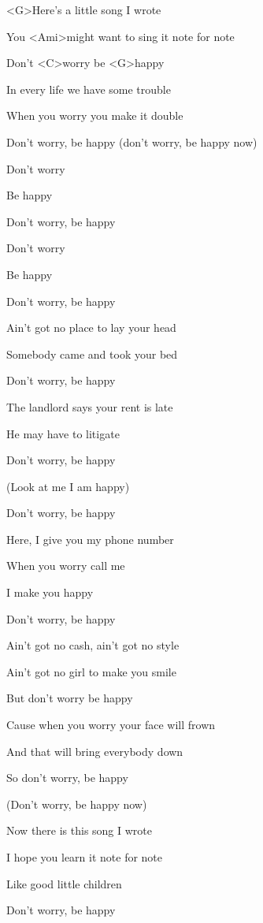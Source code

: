 

\zs
<G>Here's a little song I wrote 

You <Ami>might want to sing it note for note 

Don't <C>worry be <G>happy

In every life we have some trouble

When you worry you make it double 

Don't worry, be happy (don't worry, be happy now)
\ks

\zr
Don't worry 

Be happy

Don't worry, be happy

Don't worry

Be happy

Don't worry, be happy
\kr

\zs
Ain't got no place to lay your head 

Somebody came and took your bed

Don't worry, be happy 

The landlord says your rent is late 

He may have to litigate 

Don't worry, be happy 

(Look at me I am happy)
\ks

\zr
Don't worry, be happy 

Here, I give you my phone number 

When you worry call me

I make you happy 

Don't worry, be happy 
\kr

\zs
Ain't got no cash, ain't got no style 

Ain't got no girl to make you smile 

But don't worry be happy

Cause when you worry your face will frown 

And that will bring everybody down 

So don't worry, be happy 

(Don't worry, be happy now)
\ks

\zr
\kr

\zs
Now there is this song I wrote 

I hope you learn it note for note 

Like good little children 

Don't worry, be happy 

